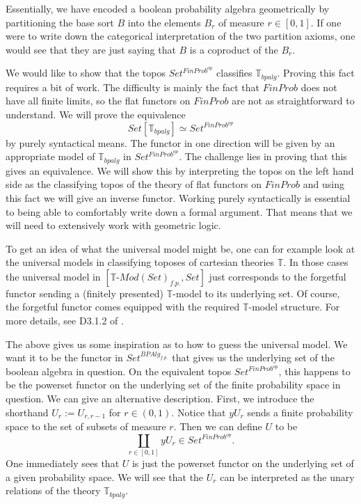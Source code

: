 \documentclass[a4paper]{amsproc}
\theoremstyle{plain}
\theoremstyle{definition}
\theoremstyle{remark}
\numberwithin{equation}{section}
\begin{document}
Essentially, we have encoded a boolean probability algebra geometrically by partitioning the base sort $B$ into the elements $B_r$ of measure $r \in [0,1]$. If one were to write down the categorical interpretation of the two partition axioms, one would see that they are just saying that $B$ is a coproduct of the $B_r$.

We would like to show that the topos $Set^{FinProb^{op}}$ classifies $\mathbb{T}_{bpalg}$. Proving this fact requires a bit of work. The difficulty is mainly the fact that  $FinProb$ does not have all finite limits, so the flat functors on $FinProb$ are not as straightforward to understand. We will prove the equivalence
\[
Set[\mathbb{T}_{bpalg}] \simeq Set^{FinProb^{op}}
\]
by purely syntactical means. The functor in one direction will be given by an appropriate model of $\mathbb{T}_{bpalg}$ in $Set^{FinProb^{op}}$. The challenge lies in proving that this gives an equivalence. We will show this by interpreting the topos on the left hand side as the classifying topos of the theory of flat functors on $FinProb$ and using this fact we will give an inverse functor. Working purely syntactically is essential to being able to comfortably write down a formal argument. That means that we will need to extensively work with geometric logic.

To get an idea of what the universal model might be, one can for example look at the universal models in classifying toposes of cartesian theories $\mathbb{T}$. In those cases the universal model in $[\mathbb{T} \text{-} Mod(Set)_{f.p.}, Set]$ just corresponds to the forgetful functor sending a (finitely presented) $\mathbb{T}$-model to its underlying set. Of course, the forgetful functor comes equipped with the required $\mathbb{T}$-model structure. For more details, see D3.1.2 of \cite{elephant}.

The above gives us some inspiration as to how to guess the universal model. We want it to be the functor in $Set^{BPAlg_{f.p.}}$ that gives us the underlying set of the boolean algebra in question. On the equivalent topos $Set^{FinProb^{op}}$, this happens to be the powerset functor on the underlying set of the finite probability space in question. We can give an alternative description. First, we introduce the shorthand $U_r := U_{r,r-1}$ for $r \in (0,1)$. Notice that $y U_r$ sends a finite probability space to the set of subsets of measure $r$. Then we can define $U$ to be
\[
\coprod_{r \in [0,1]} y U_r \in Set^{FinProb^{op}} .
\]
One immediately sees that $U$ is just the powerset functor on the underlying set of a given probability space. We will see that the $U_r$ can be interpreted as the unary relations of the theory $\mathbb{T}_{bpalg}$.
\end{document}
